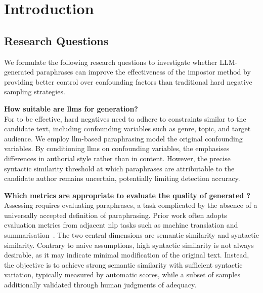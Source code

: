 \chapter{Introduction}
\label{chap:introduction}



\section{Research Questions}
\label{sec:research_questions}
We formulate the following research questions to investigate whether LLM-generated paraphrases can improve the effectiveness of the impostor method by providing better control over confounding factors than traditional hard negative sampling strategies.
\begin{questions}
    \item \textbf{How suitable are \acp{llm} for \imp{} generation?} \label{enum:rq1} \hfill \\
    For \imps{} to be effective, hard negatives need to adhere to constraints similar to the candidate text, including confounding variables such as genre, topic, and target audience.
    We employ \ac{llm}-based paraphrasing model the original confounding variables. 
    By conditioning \acp{llm} on confounding variables, the \impAppr{} emphasises differences in authorial style rather than in content. 
    However, the precise syntactic similarity threshold at which paraphrases are attributable to the candidate author remains uncertain, potentially limiting detection accuracy. 

    \item \textbf{Which metrics are appropriate to evaluate the quality of generated \imps{}?} \label{enum:rq2} \hfill \\
    Assessing \imps{} requires evaluating paraphrases, a task complicated by the absence of a universally accepted definition of paraphrasing. 
    Prior work often adopts evaluation metrics from adjacent \ac{nlp} tasks such as machine translation and summarisation~\citep{gohsen_captions_2023}. 
    The two central dimensions are semantic similarity and syntactic similarity. 
    Contrary to naive assumptions, high syntactic similarity is not always desirable, as it may indicate minimal modification of the original text.
    Instead, the objective is to achieve strong semantic similarity with sufficient syntactic variation, typically measured by automatic scores, while a subset of samples additionally validated through human judgments of adequacy.


\end{questions}
